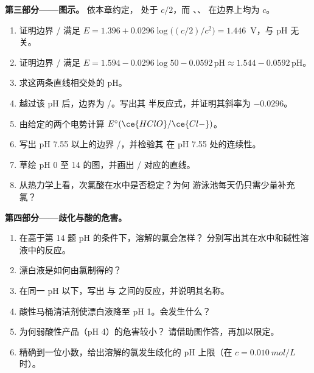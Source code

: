 \begin{problem}
\medskip
\noindent\textbf{第三部分——图示。}
依本章约定， 处于 $c/2$，而
、、 在边界上均为 $c$。
\begin{enumerate}[resume]
  \item 证明边界 / 满足 $E = 1.396 +
        0.0296\log\bigl((c/2)/c^2\bigr) = 1.446$~V，与 pH 无关。
  \item 证明边界 / 满足 $E = 1.594 -
        0.0296\log 50 - 0.0592\,\mathrm{pH} \approx 1.544 -
        0.0592\,\mathrm{pH}$。
  \item 求这两条直线相交处的 pH。
  \item 越过该 pH 后，边界为 /。写出其
        半反应式，并证明其斜率为 $-0.0296$。
  \item 由给定的两个电势计算 $E^\circ(\ce{HClO}/\ce{Cl-})$。
  \item 写出 pH 7.55 以上的边界 /，并检验其
        在 pH 7.55 处的连续性。
  \item 草绘 pH 0 至 14 的图，并画出 / 对应的直线。
  \item 从热力学上看，次氯酸在水中是否稳定？为何
        游泳池每天仍只需少量补充氯？
\end{enumerate}

\medskip
\noindent\textbf{第四部分——歧化与酸的危害。}
\begin{enumerate}[resume]
  \item 在高于第 14 题 pH 的条件下，溶解的氯会怎样？
        分别写出其在水中和碱性溶液中的反应。
  \item 漂白液是如何由氯制得的？
  \item 在同一 pH 以下，写出  与
         之间的反应，并说明其名称。
  \item 酸性马桶清洁剂使漂白液降至 pH 1。会发生什么？
  \item 为何弱酸性产品（pH 4）的危害较小？
        请借助图作答，再加以限定。
  \item 精确到一位小数，给出溶解的氯发生歧化的
        pH 上限（在 $c = \qty{0.010}{mol/L}$ 时）。
\end{enumerate}
\end{problem}
